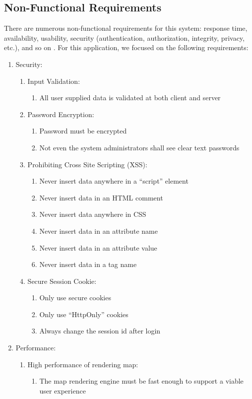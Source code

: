 \subsection{Non-Functional Requirements}
\label{sec:Requirements>Non-Functional Requirements}
There are numerous non-functional requirements for this system: response time, availability, usability, security (authentication, authorization, integrity, privacy, etc.), and so on \cite{web:NonFunc}. For this application, we focused on the following requirements:
\begin{enumerate}
  \item Security:
  \begin{enumerate}
    \item Input Validation:
    \begin{enumerate}
      \item All user supplied data is validated at both client and server
    \end{enumerate}
    \item Password Encryption:
    \begin{enumerate}
      \item Password must be encrypted
      \item Not even the system administrators shall see clear text passwords
    \end{enumerate}
    \item Prohibiting Cross Site Scripting (XSS):
    \begin{enumerate}
      \item Never insert data anywhere in a ``script'' element
      \item Never insert data in an HTML comment
      \item Never insert data anywhere in CSS
      \item Never insert data in an attribute name
      \item Never insert data in an attribute value
      \item Never insert data in a tag name
    \end{enumerate}
    \item Secure Session Cookie:
    \begin{enumerate}
      \item Only use secure cookies
      \item Only use ``HttpOnly'' cookies
      \item Always change the session id after login
    \end{enumerate}
  \end{enumerate}
  \item Performance:
  \begin{enumerate}
    \item High performance of rendering map:
    \begin{enumerate}
      \item The map rendering engine must be fast enough to support a viable user experience
    \end{enumerate}
  \end{enumerate}
\end{enumerate}

